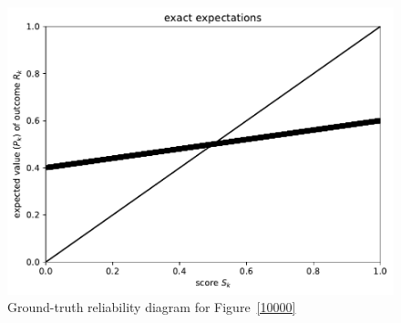 \documentclass{article}
\begin{document}
\begin{figure}
\begin{centering}

\parbox{\imsize}{\includegraphics[width=\imsize]
                {./codes/unweighted/10000_10_0_0/exact.pdf}}

\end{centering}
\caption{Ground-truth reliability diagram for Figure~\ref{10000}}
\label{10000e}
\end{figure}
\end{document}
